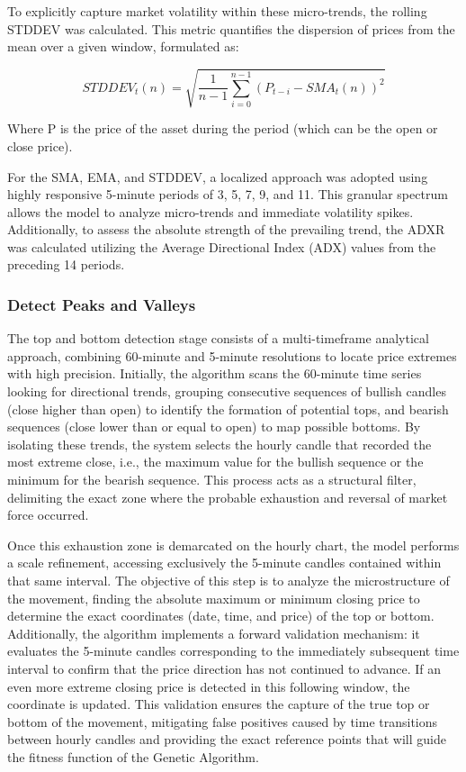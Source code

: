 \documentclass{ieeeaccess}
\begin{document}
To explicitly capture market volatility within these micro-trends, the rolling STDDEV was calculated. This metric quantifies the dispersion of prices from the mean over a given window, formulated as:

\begin{equation}
STDDEV_t(n) = \sqrt{\frac{1}{n-1} \sum_{i=0}^{n-1} \left( P_{t-i} - SMA_t(n) \right)^2}
\label{eq:stddev}
\end{equation}

Where P is the price of the asset during the period (which can be the open or close price).

For the SMA, EMA, and STDDEV, a localized approach was adopted using highly responsive 5-minute periods of 3, 5, 7, 9, and 11. This granular spectrum allows the model to analyze micro-trends and immediate volatility spikes. Additionally, to assess the absolute strength of the prevailing trend, the ADXR was calculated utilizing the Average Directional Index (ADX) values from the preceding 14 periods.

\subsubsection{Detect Peaks and Valleys}

The top and bottom detection stage consists of a multi-timeframe analytical approach, combining 60-minute and 5-minute resolutions to locate price extremes with high precision. Initially, the algorithm scans the 60-minute time series looking for directional trends, grouping consecutive sequences of bullish candles (close higher than open) to identify the formation of potential tops, and bearish sequences (close lower than or equal to open) to map possible bottoms. By isolating these trends, the system selects the hourly candle that recorded the most extreme close, i.e., the maximum value for the bullish sequence or the minimum for the bearish sequence. This process acts as a structural filter, delimiting the exact zone where the probable exhaustion and reversal of market force occurred.

Once this exhaustion zone is demarcated on the hourly chart, the model performs a scale refinement, accessing exclusively the 5-minute candles contained within that same interval. The objective of this step is to analyze the microstructure of the movement, finding the absolute maximum or minimum closing price to determine the exact coordinates (date, time, and price) of the top or bottom. Additionally, the algorithm implements a forward validation mechanism: it evaluates the 5-minute candles corresponding to the immediately subsequent time interval to confirm that the price direction has not continued to advance. If an even more extreme closing price is detected in this following window, the coordinate is updated. This validation ensures the capture of the true top or bottom of the movement, mitigating false positives caused by time transitions between hourly candles and providing the exact reference points that will guide the fitness function of the Genetic Algorithm.
\end{document}
